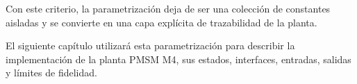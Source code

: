 Con este criterio, la parametrización deja de ser una colección de constantes aisladas y se convierte en una capa explícita de trazabilidad de la planta.

El siguiente capítulo utilizará esta parametrización para describir la implementación de la planta PMSM M4, sus estados, interfaces, entradas, salidas y límites de fidelidad.
